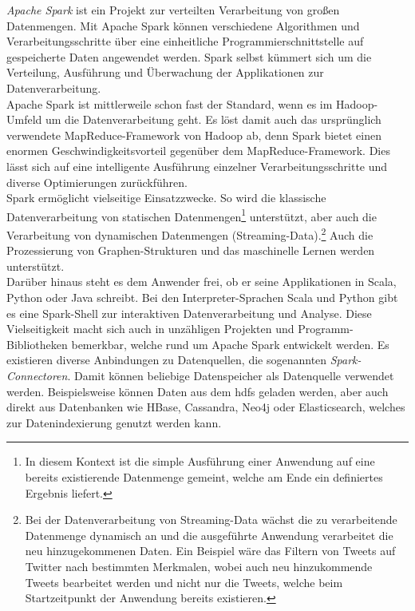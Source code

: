 \textit{Apache Spark\texttrademark\thinspace} ist ein Projekt zur verteilten Verarbeitung von großen Datenmengen. Mit Apache Spark können verschiedene Algorithmen und Verarbeitungsschritte über eine einheitliche Programmierschnittstelle auf gespeicherte Daten  angewendet werden. Spark selbst kümmert sich um die Verteilung, Ausführung und Überwachung der Applikationen zur Datenverarbeitung.\cite[S. 2]{learning_spark}\\
Apache Spark ist mittlerweile schon fast der Standard, wenn es im Hadoop-Umfeld um die Datenverarbeitung geht. Es löst damit auch das ursprünglich verwendete MapReduce-Framework von Hadoop ab, denn Spark
bietet einen enormen Geschwindigkeitsvorteil gegenüber dem MapReduce-Framework. Dies lässt sich auf eine intelligente Ausführung einzelner Verarbeitungsschritte und diverse Optimierungen zurückführen.\cite[S. 148 ff.]{expert_hadoop_admin}\\

\noindent
Spark ermöglicht vielseitige Einsatzzwecke. So wird die klassische Datenverarbeitung von statischen Datenmengen\footnote{In diesem Kontext ist die simple Ausführung einer Anwendung auf eine bereits existierende Datenmenge gemeint, welche am Ende ein definiertes Ergebnis liefert.} unterstützt, aber auch die Verarbeitung von dynamischen Datenmengen (Streaming-Data).\footnote{Bei der Datenverarbeitung von Streaming-Data wächst die zu verarbeitende Datenmenge dynamisch an und die ausgeführte Anwendung verarbeitet die neu hinzugekommenen Daten. Ein Beispiel wäre das Filtern von Tweets auf Twitter nach bestimmten Merkmalen, wobei auch neu hinzukommende Tweets bearbeitet werden und nicht nur die Tweets, welche beim Startzeitpunkt der Anwendung bereits existieren.} Auch die Prozessierung von Graphen-Strukturen und das maschinelle Lernen werden unterstützt.\cite[S. 152]{expert_hadoop_admin}\\

\noindent
Darüber hinaus steht es dem Anwender frei, ob er seine Applikationen in Scala, Python oder Java schreibt. Bei den Interpreter-Sprachen Scala und Python gibt es eine Spark-Shell zur interaktiven Datenverarbeitung und Analyse. Diese Vielseitigkeit macht sich auch in unzähligen Projekten und Programm-Bibliotheken bemerkbar, welche rund um Apache Spark entwickelt werden.
Es existieren diverse Anbindungen zu Datenquellen, die sogenannten \textit{Spark-Connectoren}. Damit können beliebige Datenspeicher als Datenquelle verwendet werden.
Beispielsweise können Daten aus dem \gls{hdfs} geladen werden, aber auch direkt aus Datenbanken wie HBase, Cassandra, Neo4j oder Elasticsearch, welches zur Datenindexierung genutzt werden kann.  \\


